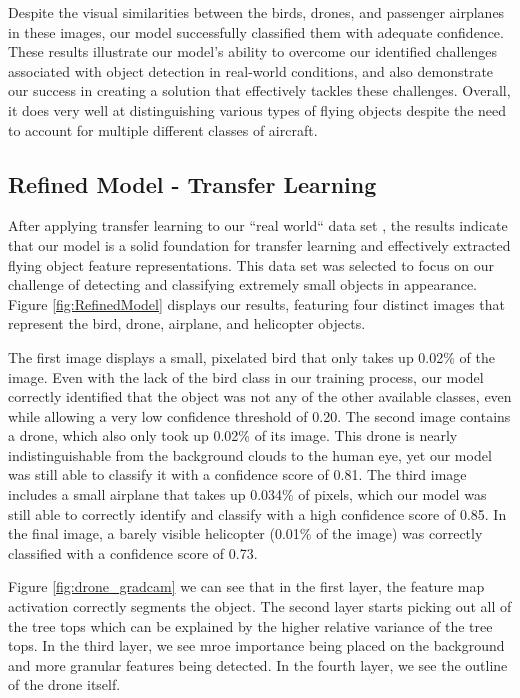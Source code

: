 \documentclass[10pt,twocolumn,letterpaper]{article}
\begin{document}
Despite the visual similarities between the birds, drones, and passenger airplanes in these images, our model successfully classified them with adequate confidence. These results illustrate our model's ability to overcome our identified challenges associated with object detection in real-world conditions, and also demonstrate our success in creating a solution that effectively tackles these challenges. Overall, it does very well at distinguishing various types of flying objects despite the need to account for multiple different classes of aircraft.

\subsection{Refined Model - Transfer Learning}

After applying transfer learning to our ``real world`` data set \cite{TransferDataset}, the results indicate that our model is a solid foundation for transfer learning and effectively extracted flying object feature representations. This data set was selected to focus on our challenge of detecting and classifying extremely small objects in appearance. Figure \ref{fig:RefinedModel} displays our results, featuring four distinct images that represent the bird, drone, airplane, and helicopter objects.

The first image displays a small, pixelated bird that only takes up 0.02\% of the image. Even with the lack of the bird class in our training process, our model correctly identified that the object was not any of the other available classes, even while allowing a very low confidence threshold of 0.20. The second image contains a drone, which also only took up 0.02\% of its image. This drone is nearly indistinguishable from the background clouds to the human eye, yet our model was still able to classify it with a confidence score of 0.81. The third image includes a small airplane that takes up 0.034\% of pixels, which our model was still able to correctly identify and classify with a high confidence score of 0.85. In the final image, a barely visible helicopter (0.01\% of the image) was correctly classified with a confidence score of 0.73.

Figure \ref{fig:drone_gradcam} we can see that in the first layer, the feature map activation correctly segments the object. The second layer starts picking out all of the tree tops which can be explained by the higher relative variance of the tree tops. In the third layer, we see mroe  importance being placed on the background and more granular features being detected. In the fourth layer, we see the outline of the drone itself. 
\end{document}
